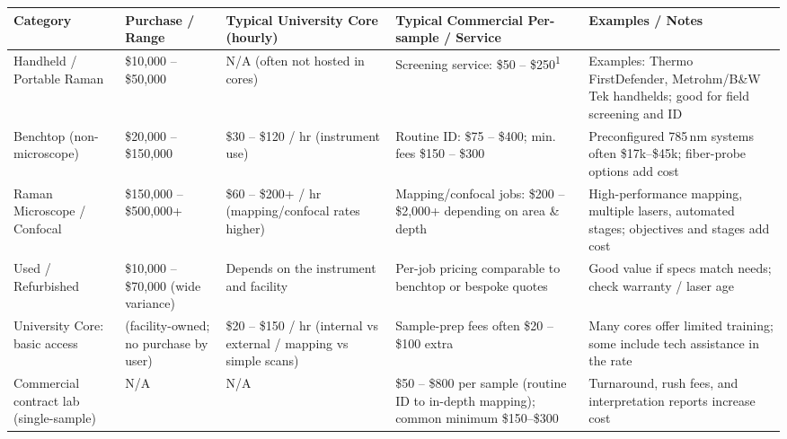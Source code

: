\documentclass{iopjournal}
\begin{document}
\begin{table}[htbp]
  \centering
   \footnotesize
  \begin{threeparttable}
    \caption{Typical costs for Raman spectroscopy (purchase, per-use, and recurring expenses). All amounts shown in USD and are indicative ranges.}
    \label{tab:raman-costs}
    \begin{longtable}{@{} L P P P P @{}}
      \toprule
      \textbf{Category} & \textbf{Purchase / Range} & \textbf{Typical University Core (hourly)} & \textbf{Typical Commercial Per-sample / Service} & \textbf{Examples / Notes} \\
      \midrule

      Handheld / Portable Raman
        & \$10,000 -- \$50,000
        & N/A (often not hosted in cores)
        & Screening service: \$50 -- \$250\textsuperscript{1}
        & Examples: Thermo FirstDefender, Metrohm/B\&W Tek handhelds; good for field screening and ID \\

      Benchtop (non-microscope)
        & \$20,000 -- \$150,000
        & \$30 -- \$120 / hr (instrument use)
        & Routine ID: \$75 -- \$400; min. fees \$150 -- \$300
        & Preconfigured 785\,nm systems often \$17k--\$45k; fiber-probe options add cost \\

      Raman Microscope / Confocal
        & \$150,000 -- \$500,000+
        & \$60 -- \$200+ / hr (mapping/confocal rates higher)
        & Mapping/confocal jobs: \$200 -- \$2,000+ depending on area \& depth
        & High-performance mapping, multiple lasers, automated stages; objectives and stages add cost \\

      Used / Refurbished
        & \$10,000 -- \$70,000 (wide variance)
        & Depends on the instrument and facility
        & Per-job pricing comparable to benchtop or bespoke quotes
        & Good value if specs match needs; check warranty / laser age \\

      University Core: basic access
        & (facility-owned; no purchase by user)
        & \$20 -- \$150 / hr (internal vs external / mapping vs simple scans)
        & Sample-prep fees often \$20 -- \$100 extra
        & Many cores offer limited training; some include tech assistance in the rate \\

      Commercial contract lab (single-sample)
        & N/A
        & N/A
        & \$50 -- \$800 per sample (routine ID to in-depth mapping); common minimum \$150--\$300
        & Turnaround, rush fees, and interpretation reports increase cost \\


\end{longtable}
\end{threeparttable}
\end{table}
\end{document}
